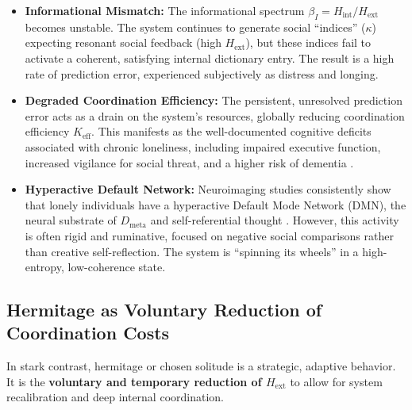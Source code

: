 \documentclass[12pt,a4paper]{article}
\begin{document}
	\begin{itemize}
		\item \textbf{Informational Mismatch:} The informational spectrum \(\beta_I = H_{\mathrm{int}}/H_{\mathrm{ext}}\) becomes unstable. The system continues to generate social ``indices'' (\(\kappa\)) expecting resonant social feedback (high \(H_{\mathrm{ext}}\)), but these indices fail to activate a coherent, satisfying internal dictionary entry. The result is a high rate of prediction error, experienced subjectively as distress and longing.
		\item \textbf{Degraded Coordination Efficiency:} The persistent, unresolved prediction error acts as a drain on the system's resources, globally reducing coordination efficiency \(K_{\mathrm{eff}}\). This manifests as the well-documented cognitive deficits associated with chronic loneliness, including impaired executive function, increased vigilance for social threat, and a higher risk of dementia \cite{Finley2025}.
		\item \textbf{Hyperactive Default Network:} Neuroimaging studies consistently show that lonely individuals have a hyperactive Default Mode Network (DMN), the neural substrate of \(D_{\text{meta}}\) and self-referential thought \cite{Spreng2020}. However, this activity is often rigid and ruminative, focused on negative social comparisons rather than creative self-reflection. The system is ``spinning its wheels'' in a high-entropy, low-coherence state.
	\end{itemize}
	
	\subsection{Hermitage as Voluntary Reduction of Coordination Costs}
	
	In stark contrast, hermitage or chosen solitude is a strategic, adaptive behavior. It is the \textbf{voluntary and temporary reduction of \(H_{\mathrm{ext}}\)} to allow for system recalibration and deep internal coordination.
	
\end{document}
